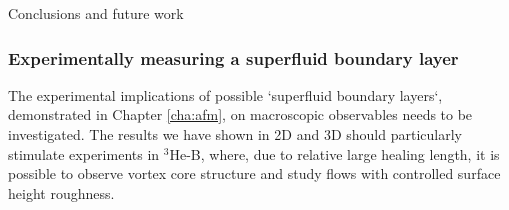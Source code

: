 \begin{chapter}{\label{cha:conc}Conclusions and future work}
\subsubsection{Experimentally measuring a superfluid boundary layer}
The experimental implications of possible `superfluid boundary layers`, demonstrated in Chapter \ref{cha:afm}, on macroscopic observables needs to be investigated.  The results we have shown in 2D and 3D should particularly stimulate experiments in $^3$He-B, where, due to relative
large healing length, it is possible to observe vortex core structure and study flows with controlled surface height roughness. 
\end{chapter}